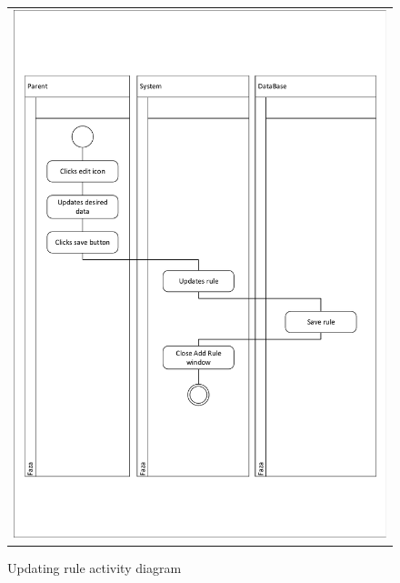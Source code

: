 \documentclass{sprawozdanie-agh}
\begin{document}
			\begin{figure}[H]
				\centering
				\begin{tabular}{c}
					\includegraphics[width=.95\textwidth]{crudUpdate_cropped} 
				\end{tabular}
			\caption{Updating rule activity diagram}
			\end{figure}
\end{document}

